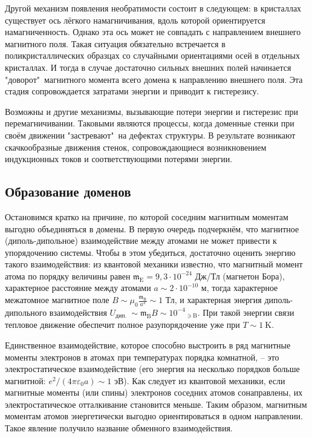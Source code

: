 \documentclass[a4paper,14pt]{article} %
\begin{document}
Другой механизм появления необратимости состоит в следующем: в кристаллах существует $\textbf{ось лёгкого намагничивания}$, вдоль которой ориентируется намагниченность. Однако эта ось может не совпадать с направлением внешнего магнитного поля. Такая ситуация обязательно встречается в $\textbf{поликристаллических образцах}$ со случайными ориентациями осей в отдельных кристаллах. И тогда в случае достаточно сильных внешних полей начинается "доворот"\ магнитного момента всего домена к направлению внешнего поля. Эта стадия сопровождается затратами энергии и приводит к гистерезису.

Возможны и другие механизмы, вызывающие потери энергии и гистерезис при перемагничивании. Таковыми являются процессы, когда доменные стенки при своём движении "застревают"\ на дефектах структуры. В результате возникают скачкообразные движения стенок, сопровождающиеся возникновением индукционных токов и соответствующими потерями энергии.

\subsection{Образование доменов}

Остановимся кратко на причине, по которой соседним магнитным моментам выгодно объединяться в домены. В первую очередь подчеркнём, что $\textbf{магнитное}$ (диполь-дипольное) взаимодействие между атомами $\textbf{не может}$ привести к упорядочению системы. Чтобы в этом убедиться, достаточно оценить энергию такого взаимодействия: из квантовой механики известно, что магнитный момент атома по порядку величины равен $\mathfrak{m}_{\mathrm{E}}=9,3 \cdot 10^{-24}$ Дж/Тл (магнетон Бора), характерное расстояние между атомами $a \sim 2 \cdot 10^{-10}$ м, тогда характерное межатомное магнитное поле $B \sim \mu_{0} \frac{\mathfrak{m}_{\mathrm{B}}}{a^{3}} \sim 1$ Тл, и характерная энергия диполь-дипольного взаимодействия $U_{\text {дип. }} \sim \mathfrak{m}_{\mathrm{B}} B \sim 10^{-4}{ }_{\ni \mathrm{B}}$. При такой энергии связи тепловое движение обеспечит полное разупорядочение уже при $T \sim 1 \mathrm{~K}$.

Единственное взаимодействие, которое способно выстроить в ряд магнитные моменты электронов в атомах при температурах порядка комнатной, -- это $\textbf{электростатическое взаимодействие}$ (его энергия на несколько порядков больше магнитной: $e^{2} /\left(4 \pi \varepsilon_{0} a\right) \sim 1$ эВ). Как следует из квантовой механики, если магнитные моменты (или спины) электронов соседних атомов сонаправлены, их электростатическое отталкивание становится меньше. Таким образом, магнитным моментам атомов энергетически выгодно ориентироваться в одном направлении. Такое явление получило название $\textbf{обменного}$ $\textbf{взаимодействия}$.
\end{document}
